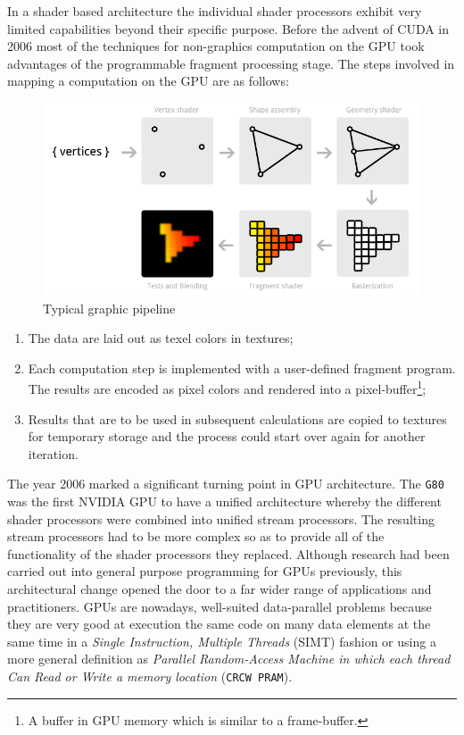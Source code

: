     In a shader based architecture the individual shader processors exhibit very limited capabilities beyond their specific purpose.
    Before the advent of CUDA in 2006 most of the techniques for non-graphics
    computation on the GPU took advantages of the programmable fragment processing stage. The steps involved in mapping a computation on the GPU are
    as follows:
    \begin{figure}
    	\centering
    	\caption{Typical graphic pipeline}\label{graphicPipeline}
    	\includegraphics[width=1.0\textwidth]{./images/parallel_programming/pipeline}
    \end{figure}
    
    \begin{enumerate}
    	\item The data are laid out as texel colors in textures;
    	\item  Each computation step is implemented with a
    	user-defined fragment program. The results are encoded as pixel 
    	colors and rendered into a pixel-buffer\footnote{ A buffer in GPU memory
    		which is similar to a frame-buffer.}; 
    	\item Results that are
    	to be used in subsequent calculations are copied to textures for temporary storage and the process could start over again for another iteration.
    \end{enumerate} 
    
    The year 2006 marked a significant turning point in GPU architecture. The \texttt{G80}  was the first \textsc{NVIDIA} GPU to have a unified architecture whereby the different shader processors were  combined into unified stream processors. The resulting stream processors had to be more complex so as to provide all of the functionality of the shader processors they replaced. Although research had been carried out into general purpose programming
    for GPUs previously, this architectural change opened the door to a far wider range of  applications and practitioners.    
    GPUs are nowadays, well-suited data-parallel problems because they are very good at execution the same code on many data elements at the same time  in a \textit{Single Instruction, Multiple Threads} (SIMT) fashion or using a more general definition as \textit{Parallel Random-Access Machine in which each thread Can Read or Write a memory location} (\texttt{CRCW PRAM}).
    
